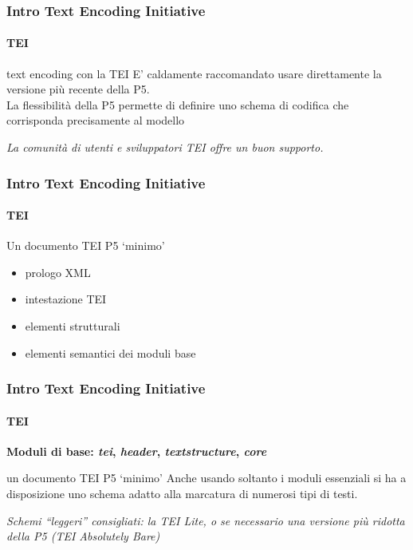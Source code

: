 \begin{frame}
	\frametitle{Intro Text Encoding Initiative}
	\framesubtitle{TEI}
	\addtocounter{nframe}{1}

	\begin{block}{text encoding con la TEI}
		E' caldamente raccomandato usare direttamente la
		versione più recente della P5.\\
		La flessibilità della P5 permette di definire uno schema di
		codifica che corrisponda precisamente al modello
    \end{block}
    
    \textit{La comunità di utenti e sviluppatori TEI offre un buon supporto.}

\end{frame}





\begin{frame}
	\frametitle{Intro Text Encoding Initiative}
	\framesubtitle{TEI}
	\addtocounter{nframe}{1}

	\begin{block}{Un documento TEI P5 ‘minimo’}
        \begin{itemize}
            \item prologo XML
            \item intestazione TEI
            \item elementi strutturali
            \item elementi semantici dei moduli base
        \end{itemize}
    \end{block}
    
\end{frame}

\begin{frame}
	\frametitle{Intro Text Encoding Initiative}
	\framesubtitle{TEI}
	\addtocounter{nframe}{1}

   \textbf{ Moduli di base: \textit{tei}, \textit{header}, \textit{textstructure}, \textit{core}}

	\begin{block}{un documento TEI P5 ‘minimo’}
        Anche usando soltanto i moduli essenziali si ha a disposizione
        uno schema adatto alla marcatura di numerosi tipi di testi.
    \end{block}
 
       \textit{Schemi ``leggeri'' consigliati: la TEI Lite, o se necessario una
        versione più ridotta della P5 (TEI
        Absolutely Bare)}
\end{frame}



